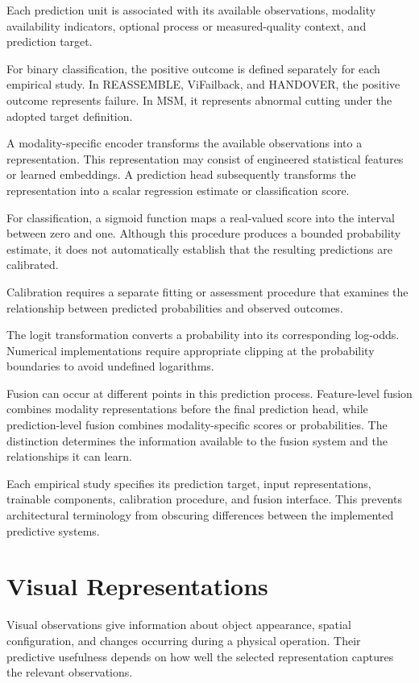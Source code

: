 Each prediction unit is associated with its available observations, modality availability indicators, optional process or measured-quality context, and prediction target.

For binary classification, the positive outcome is defined separately for each empirical study. In REASSEMBLE, ViFailback, and HANDOVER, the positive outcome represents failure. In MSM, it represents abnormal cutting under the adopted target definition.

A modality-specific encoder transforms the available observations into a representation. This representation may consist of engineered statistical features or learned embeddings. A prediction head subsequently transforms the representation into a scalar regression estimate or classification score.

For classification, a sigmoid function maps a real-valued score into the interval between zero and one. Although this procedure produces a bounded probability estimate, it does not automatically establish that the resulting predictions are calibrated.

Calibration requires a separate fitting or assessment procedure that examines the relationship between predicted probabilities and observed outcomes.

The logit transformation converts a probability into its corresponding log-odds. Numerical implementations require appropriate clipping at the probability boundaries to avoid undefined logarithms.

Fusion can occur at different points in this prediction process. Feature-level fusion combines modality representations before the final prediction head, while prediction-level fusion combines modality-specific scores or probabilities. The distinction determines the information available to the fusion system and the relationships it can learn.

Each empirical study specifies its prediction target, input representations, trainable components, calibration procedure, and fusion interface. This prevents architectural terminology from obscuring differences between the implemented predictive systems.

\section{Visual Representations}

Visual observations give information about object appearance, spatial configuration, and changes occurring during a physical operation. Their predictive usefulness depends on how well the selected representation captures the relevant observations.

